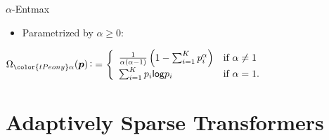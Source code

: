 \documentclass[xetex,aspectratio=169,xcolor,professionalfonts,hyperref]{beamer}
\begin{document}
\begin{frame}{$\alpha$-Entmax}
    \vspace{-1cm}
    \fontsize{12pt}{15}\selectfont
    \begin{itemize}
    \item[] Parametrized by {\color{tPeony}$\alpha \ge 0$}:
    \end{itemize}
    \bigskip
    \begin{center}
    $\displaystyle
    \Omega_{{\color{tPeony}\alpha}}(\vectsymb{p}) \defeq 
    \left\{
    \begin{array}{ll}
    \frac{1}{\alpha(\alpha-1)} \left(1 - \sum_{i=1}^K p_i^{\alpha}\right) & \text{if $\alpha \ne 1$}\\
    \sum_{i=1}^K p_i\log p_i & \text{if $\alpha = 1$.}
    \end{array}
    \right.$
    \end{center}
    \bigskip
    \begin{itemize}
    \end{itemize}
    \bigskip
    \begin{itemize}
    \end{itemize}

\end{frame}

\begin{frame}
    \centering
    
\end{frame}

\section{Adaptively Sparse Transformers}
\end{document}
